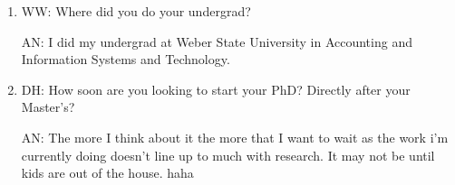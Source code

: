 \begin{enumerate}
    \item WW: Where did you do your undergrad?

	AN: I did my undergrad at Weber State University in Accounting and Information Systems and Technology. 

    \item DH: How soon are you looking to start your PhD? Directly after your Master's?

	AN: The more I think about it the more that I want to wait as the work i'm currently doing doesn't line up to much with research. It may not be until kids are out of the house. haha
\end{enumerate}

